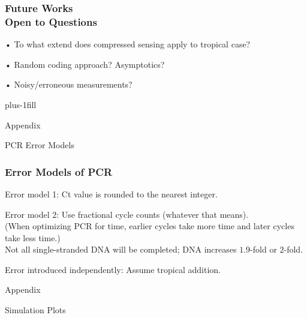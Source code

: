 \documentclass[12pt,aspectratio=169]{beamer}
\begin{document}
\begin{frame}\frametitle{Future Works \\ Open to Questions}
	• To what extend does compressed sensing apply to tropical case?
	\par
	• Random coding approach? Asymptotics?
	\par
	• Noisy/erroneous measurements?
	\par
	\centering
	\vskip5mm
	\inserttitlegraphic
	\vskip0pt plus-1fill
\end{frame}

\appendix

\begin{frame}\centering
	\huge\alert{Appendix}
	\par
	\Huge PCR Error Models
\end{frame}

\begin{frame}\frametitle{Error Models of PCR}
	Error model 1: Ct value is rounded to the nearest integer.
	\par
	Error model 2: Use fractional cycle counts (whatever that means). \\
	(When optimizing PCR for time,
	earlier cycles take more time and later cycles take less time.) \\
	Not all single-stranded DNA will be completed;
	DNA increases $1.9$-fold or $2$-fold.
	\par
	Error introduced independently:  Assume tropical addition.
\end{frame}

\begin{frame}\centering
	\huge\alert{Appendix}
	\par
	\Huge Simulation Plots
\end{frame}

\fontsize{11pt}{11pt}\selectfont
\newcount\accumulatenumplots
{}
\end{document}
